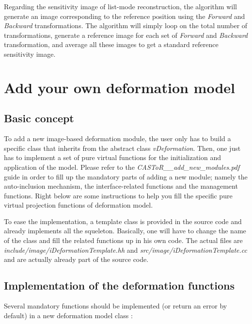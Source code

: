 \documentclass[a4paper, 11pt]{article}
\begin{document}
Regarding the sensitivity image of list-mode reconstruction, the algorithm will generate an image corresponding to the reference position using the \textit{Forward} and \textit{Backward} transformations. The algorithm will simply loop on the total number of transformations, generate a reference image for each set of \textit{Forward} and \textit{Backward} transformation, and average all these images to get a standard reference sensitivity image.


\clearpage
\section{Add your own deformation model}
\label{section_Add your own deformation model}

\subsection{Basic concept}

To add a new image-based deformation module, the user only has to build a specific class that inherits from the abstract class \textit{vDeformation}. Then, one just has to implement a set of pure virtual functions for the initialization and application of the model. Please refer to the \textit{CASToR\_\_add\_new\_modules.pdf} guide in order to fill up the mandatory parts of adding a new module; namely the auto-inclusion mechanism, the interface-related functions and the management functions. Right below are some instructions to help you fill the specific pure virtual projection functions of deformation model.

\bigskip
To ease the implementation, a template class is provided in the source code and already implements all the squeleton. Basically, one will have to change the name of the class and fill the related functions up in his own code. The actual files are \textit{include/image/iDeformationTemplate.hh} and \textit{src/image/iDeformationTemplate.cc} and are actually already part of the source code.

\subsection{Implementation of the deformation functions}

Several mandatory functions should be implemented (or return an error by default) in a new deformation model class :
\end{document}
